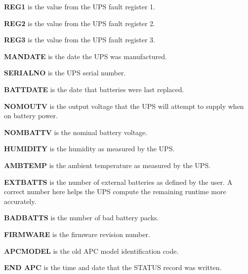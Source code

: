 {{{{{{{{{{{{{{{\begin{description}
\item {\bf REG1}
is the value from the UPS fault register 1.  

\item {\bf REG2}
is the value from the UPS fault register 2.  

\item {\bf REG3}
is the value from the UPS fault register 3.  

\item {\bf MANDATE}
is the date the UPS was manufactured.  

\item {\bf SERIALNO}
is the UPS serial number.  

\item {\bf BATTDATE}
is the date that batteries were last replaced.  

\item {\bf NOMOUTV}
is the output voltage that the UPS will attempt to supply when on battery
power.  

\item {\bf NOMBATTV}
is the nominal battery voltage.  

\item {\bf HUMIDITY}
is the humidity as measured by the UPS.  

\item {\bf AMBTEMP}
is the ambient temperature as measured by the UPS.  

\item {\bf EXTBATTS}
is the number of external batteries as defined by the user. A correct number
here helps the UPS compute the remaining runtime more accurately.  

\item {\bf BADBATTS}
is the number of bad battery packs.  

\item {\bf FIRMWARE}
is the firmware revision number.  

\item {\bf APCMODEL}
is the old APC model identification code.  

\item {\bf END APC}
is the time and date that the STATUS record was written. 
\end{description}

}}}}}}}}}}}}}}}
